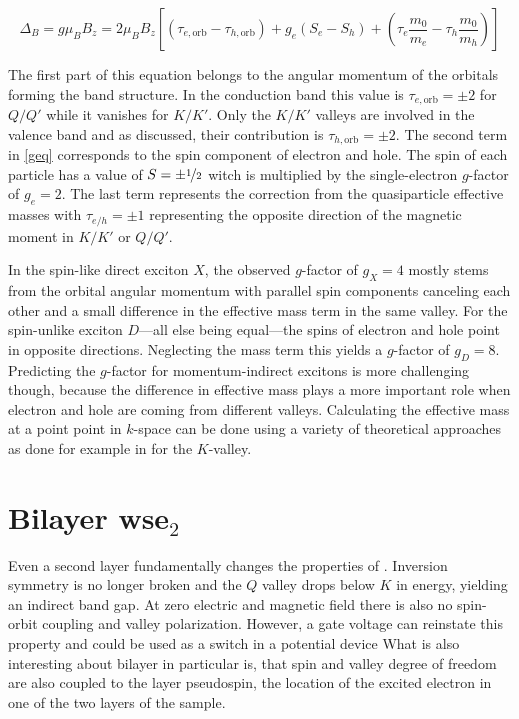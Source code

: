 \[\Delta_B=g\mu_BB_z = 2\mu_BB_z\left[(\tau_{e, \mathrm{orb}}-\tau_{h, \mathrm{orb}})+g_e(S_e-S_h) + \left(\tau_e \frac{m_0}{m_e}-\tau_h \frac{m_0}{m_h}\right)\right]\label{geq}\]

The first part of this equation belongs to the angular momentum of the orbitals forming the band structure. In the conduction band this value is $\tau_{e, \mathrm{orb}}=\pm2$ for $Q/Q'$ while it vanishes for $K/K'$. Only the $K/K'$ valleys are involved in the valence band and as discussed, their contribution is $\tau_{h, \mathrm{orb}}=\pm2$. The second term in \eqref{geq} corresponds to the spin component of electron and hole. The spin of each particle has a value of $S=\pm\nicefrac{1}{2}$ witch is multiplied by the single-electron $g$-factor of $g_e=2$. The last term represents the correction from the quasiparticle effective masses with $\tau_{e/h}=\pm1$ representing the opposite direction of the magnetic moment in $K/K'$ or $Q/Q'$.

In the spin-like direct exciton $X$, the observed $g$-factor of $g_X=4$ mostly stems from the orbital angular momentum with parallel spin components canceling each other and a small difference in the effective mass term in the same valley. For the spin-unlike exciton $D$---all else being equal---the spins of electron and hole point in opposite directions. Neglecting the mass term this yields a $g$-factor of $g_D=8$. Predicting the $g$-factor for momentum-indirect excitons is more challenging though, because the difference in effective mass plays a more important role when electron and hole are coming from different valleys. Calculating the effective mass at a point point in $k$-space can be done using a variety of theoretical approaches as done for example in \cite{rybkovskiy_atomically_2017} for the $K$-valley.

\section{Bilayer ws\textup{e}$_2$}\label{bilayer_theory}

Even a second layer fundamentally changes the properties of \wse\!. Inversion symmetry is no longer broken and the $Q$ valley drops below $K$ in energy, yielding an indirect band gap\cite{zibouche_transition-metal_2014_2}. At zero electric and magnetic field there is also no spin-orbit coupling and valley polarization. However, a gate voltage can reinstate this property and could be used as a switch in a potential device\cite{zibouche_transition-metal_2014} What is also interesting about bilayer \wse in particular is, that spin and valley degree of freedom are also coupled to the layer pseudospin, the location of the excited electron in one of the two layers of the sample\cite{jones_spin-layer_2014}.

